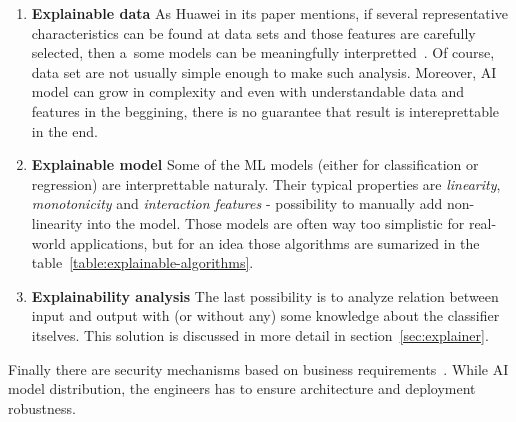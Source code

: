 \begin{enumerate}
    \item \textbf{Explainable data}
    As Huawei in its paper mentions, if several representative characteristics can be found at data sets and those features are carefully selected, then a~some models can be meaningfully interpretted~\cite{huawei_security}.
    Of course, data set are not usually simple enough to make such analysis.
    Moreover, AI model can grow in complexity and even with understandable data and features in the beggining, there is no guarantee that result is intereprettable in the end.

    \item \textbf{Explainable model}
    Some of the ML models (either for classification or regression) are interprettable naturaly.
    Their typical properties are \textit{linearity}, \textit{monotonicity} and \textit{interaction features} - possibility to manually add non-linearity into the model.
    Those models are often way too simplistic for real-world applications, but for an idea those algorithms are sumarized in the table~\ref{table:explainable-algorithms}.

    \item \textbf{Explainability analysis}
    The last possibility is to analyze relation between input and output with (or without any) some knowledge about the classifier itselves.
    This solution is discussed in more detail in section~\ref{sec:explainer}.
\end{enumerate}

Finally there are security mechanisms based on business requirements~\cite{huawei_security}.
While AI model distribution, the engineers has to ensure architecture and deployment robustness.

